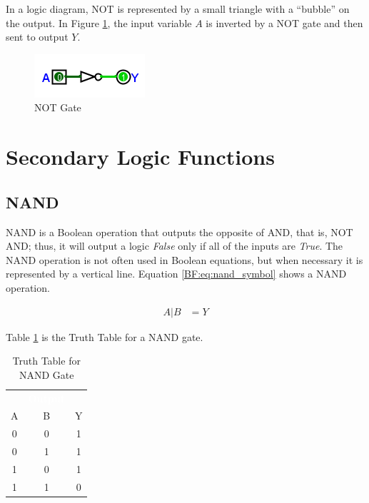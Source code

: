 In a logic diagram, \textsf{NOT}  is represented by a small triangle with a ``bubble'' on the output. In Figure \ref{fig:04_04}, the input variable $ A $ is inverted by a \textsf{NOT}  gate and then sent to output $ Y $. 

\begin{figure}[H]
	\centering
	\includegraphics[width=\maxwidth{.95\linewidth}]{gfx/04_04}
	\caption{NOT Gate}
	\label{fig:04_04}
\end{figure}


\section{Secondary Logic Functions}
\label{BF:sec:secondary_logic_functions}
\subsection{NAND}
\label{BF:subsec:nand}

\textsf{NAND} is a Boolean operation that outputs the opposite of \textsf{AND}, that is, \textsf{NOT AND}; thus, it will output a logic \emph{False} only if all of the inputs are \emph{True}. The \textsf{NAND} operation is not often used in Boolean equations, but when necessary it is represented by a vertical line. Equation \ref{BF:eq:nand_symbol} shows a \textsf{NAND}  operation.

\begin{align}
  \label{BF:eq:nand_symbol}
  A | B &= Y 
\end{align}

Table \ref{BF:tab:truth_table_for_nand_gate} is the Truth Table for a \textsf{NAND}  gate.

\begin{table}[H]
  \sffamily
  \newcommand{\head}[1]{\textcolor{white}{\textbf{#1}}}    
  \begin{center}
    \begin{tabular}{ccc} 
      \rowcolor{black!75}
      \multicolumn{2}{c}{\head{Inputs}} & \head{Output} \\
      A & B & Y \\
      \hline
      0 & 0 & 1 \\
      0 & 1 & 1 \\
      1 & 0 & 1 \\
      1 & 1 & 0 
    \end{tabular}
  \end{center}
  \caption{Truth Table for \textsf{NAND}  Gate}
  \label{BF:tab:truth_table_for_nand_gate}
\end{table}

